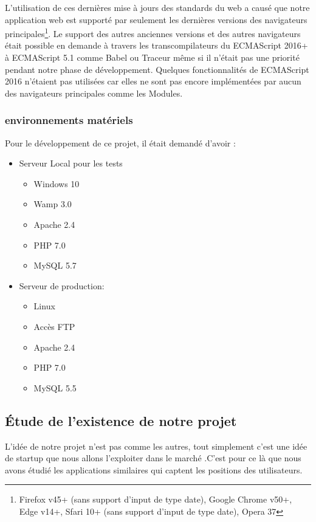 L'utilisation de ces dernières mise à jours des standards du web a causé que
notre application web est supporté par seulement les dernières versions des
navigateurs principales\footnote{Firefox v45+ (sans support d'input de type
date), Google Chrome v50+, Edge v14+, Sfari 10+ (sans support d'input de type
date), Opera 37}. Le support des autres anciennes versions et des autres
navigateurs était possible en demande à travers les transcompilateurs du
ECMAScript 2016+ à ECMAScript 5.1 comme Babel ou Traceur même si il n'était pas
une priorité pendant notre phase de développement. Quelques fonctionnalités de
ECMAScript 2016 n'étaient pas utilisées car elles ne sont pas encore
implémentées par aucun des navigateurs principales comme les Modules.

\subsubsection{environnements matériels}

Pour le développement de ce projet, il était demandé d'avoir :
\begin{itemize}
 \item Serveur Local pour les tests
     \begin{itemize}
         \item Windows 10
         \item Wamp 3.0
         \item Apache 2.4
         \item PHP 7.0
         \item MySQL 5.7
     \end{itemize}
 \item Serveur de production:
     \begin{itemize}
      \item Linux
      \item Accès FTP
      \item Apache 2.4
      \item PHP 7.0
      \item MySQL 5.5
     \end{itemize}
\end{itemize}
\subsection{Étude de l'existence de notre projet}
L'idée de notre projet n'est pas comme les autres, tout simplement c'est une idée de startup que
nous allons l'exploiter dans le marché .C'est pour ce là que nous avons étudié les applications similaires
qui captent les positions des utilisateurs.
